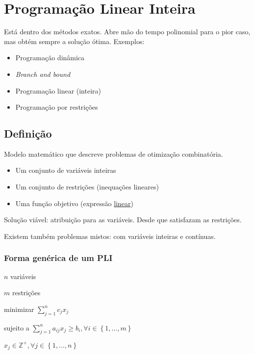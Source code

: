 \chapter{Programação Linear Inteira}
\label{chp:semana4}

Está dentro dos métodos exatos. Abre mão do tempo polinomial para o pior caso, mas obtém sempre a solução ótima. Exemplos:

\begin{itemize}
    \item Programação dinâmica
    \item \textit{Branch and bound}
    \item Programação linear (inteira)
    \item Programação por restrições
\end{itemize}

\section{Definição}

Modelo matemático que descreve problemas de otimização combinatória.

\begin{itemize}
    \item Um conjunto de variáveis inteiras
    \item Um conjunto de restrições (inequações lineares)
    \item Uma função objetivo (expressão \underline{linear})
\end{itemize}

Solução viável: atribuição para as variáveis. Desde que satisfazam as restrições.

\begin{example}
    Existem também problemas mistos: com variáveis inteiras e contínuas.
\end{example}

\subsection{Forma genérica de um PLI}

\begin{example}
    $n$ variáveis
    
    $m$ restrições
    
    minimizar $\sum_{j=1}^n c_jx_j$
    
    sujeito a $\sum_{j=1}^n a_{ij}x_j\geq b_i, \forall i \in \left\{ 1,\dots , m\right\}$
    
    $x_j \in \mathbb{Z}^+, \forall j \in \left\{ 1, \dots ,n\right\}$
\end{example}

